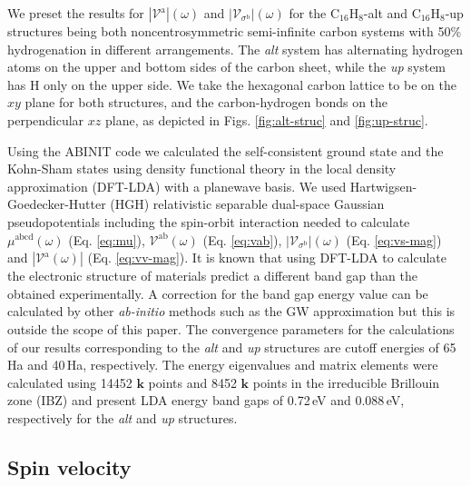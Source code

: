 \documentclass[prb,11pt,tightenlines,twocolumn,aps]{revtex4-1}
\begin{document}
We preset the results for $|\mathcal{V}^{\mathrm{a}}|(\omega)$ and
$|\mathcal{V}_{\sigma^{\mathrm{b}}}|(\omega)$ for the C$_{16}$H$_{8}$-alt and
C$_{16}$H$_{8}$-up structures being both noncentrosymmetric semi-infinite carbon
systems with 50\% hydrogenation in different arrangements. The \emph{alt} system
has alternating hydrogen atoms on the upper and bottom sides of the carbon
sheet, while the \emph{up} system has H only on the upper side. We take the
hexagonal carbon lattice to be on the $xy$ plane for both structures, and the
carbon-hydrogen bonds on the perpendicular $xz$ plane, as depicted in Figs.
\ref{fig:alt-struc} and \ref{fig:up-struc}.

Using the ABINIT code \cite{gonzeCPC09} we calculated the self-consistent ground
state and the Kohn-Sham states using density functional theory in the local
density approximation (DFT-LDA) with a planewave basis. We used Hartwigsen-
Goedecker-Hutter (HGH) relativistic separable dual-space Gaussian
pseudopotentials \cite{hartwigsenPRB98} including the spin-orbit interaction
needed to calculate $\mu^{\mathrm{abcd}}(\omega)$ (Eq.
\eqref{eq:mu}), $\mathcal{V}^{\mathrm{ab}}(\omega)$ (Eq. \eqref{eq:vab}),
$|\mathcal{V}_{\sigma^{\mathrm{b}}}|(\omega)$ (Eq. \eqref{eq:vs-mag}) and
$|\mathcal{V}^{\mathrm{a}}(\omega)|$ (Eq. \eqref{eq:vv-mag}).
%
It is known that using DFT-LDA to calculate the electronic structure of
materials predict a different band gap than the obtained experimentally. A
correction for the band gap energy value can be calculated by other 
\emph{ab-initio} methods such as the GW approximation \cite{onidaRMP02} but this
is outside the scope of this paper.
% 
The convergence parameters for the calculations of our results corresponding to
the \emph{alt} and \emph{up} structures are cutoff energies of 65\,Ha and
40\,Ha, respectively. The energy eigenvalues and matrix elements were calculated
using 14452 $\mathbf{k}$ points and 8452 $\mathbf{k}$ points in the irreducible
Brillouin zone (IBZ) and present LDA energy band gaps of 0.72\,eV and 0.088\,eV,
respectively for the \emph{alt} and \emph{up} structures. 



\subsection{Spin velocity} %
\label{sec:res-spin_velocity}
\end{document}
